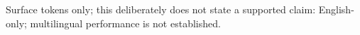 Surface tokens only; this deliberately does not state a supported claim: English-only; multilingual performance is not established.
